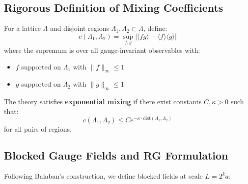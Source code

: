 \subsection{Rigorous Definition of Mixing Coefficients}

\begin{definition}
\label{def:ds-mixing}
For a lattice $\Lambda$ and disjoint regions $\Lambda_1, \Lambda_2 \subset \Lambda$, define:
\begin{equation}
c(\Lambda_1, \Lambda_2) = \sup_{f,g} \left| \langle f g \rangle - \langle f \rangle \langle g \rangle \right|
\end{equation}
where the supremum is over all gauge-invariant observables with:
\begin{itemize}
\item $f$ supported on $\Lambda_1$ with $\|f\|_\infty \le 1$
\item $g$ supported on $\Lambda_2$ with $\|g\|_\infty \le 1$
\end{itemize}

The theory satisfies \textbf{exponential mixing} if there exist constants $C, \kappa > 0$ such that:
\begin{equation}
c(\Lambda_1, \Lambda_2) \le C e^{-\kappa \cdot \text{dist}(\Lambda_1, \Lambda_2)}
\end{equation}
for all pairs of regions.
\end{definition}

\subsection{Blocked Gauge Fields and RG Formulation}

Following Balaban's construction, we define blocked fields at scale $L = 2^k a$:

